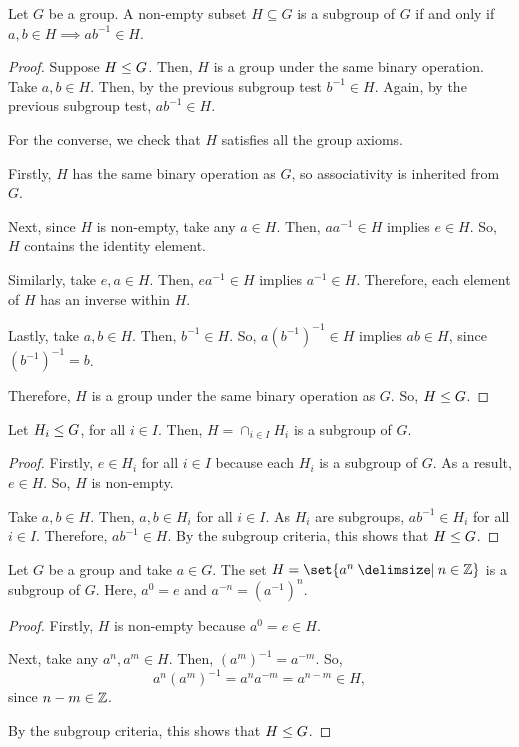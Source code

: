 \documentclass[11pt]{penrose}
\begin{document}
\begin{nthm}
    Let $G$ be a group. A non-empty subset $H \subseteq G$ is a subgroup of $G$ if and only if $a, b \in H \implies ab^{-1} \in H$.
\end{nthm}
\begin{proof}
    Suppose $H \mathrel{\leq} G$. Then, $H$ is a group under the same binary operation. Take $a, b \in H$. Then, by the previous subgroup test $b^{-1} \in H$. Again, by the previous subgroup test, $a b^{-1} \in H$.

    For the converse, we check that $H$ satisfies all the group axioms.

    Firstly, $H$ has the same binary operation as $G$, so associativity is inherited from $G$.

    Next, since $H$ is non-empty, take any $a \in H$. Then, $a a^{-1} \in H$ implies $e \in H$. So, $H$ contains the identity element.

    Similarly, take $e, a \in H$. Then, $e a^{-1} \in H$ implies $a^{-1} \in H$. Therefore, each element of $H$ has an inverse within $H$.

    Lastly, take $a, b \in H$. Then, $b^{-1} \in H$. So, $a \left(b^{-1}\right)^{-1} \in H$ implies $ab \in H$, since $\left(b^{-1}\right)^{-1} = b$.

    Therefore, $H$ is a group under the same binary operation as $G$. So, $H \mathrel{\leq} G$.
\end{proof}

\begin{nthm}
    Let $H_i \mathrel{\leq} G$, for all $i \in I$. Then, $H = \cap_{i \in I} H_i$ is a subgroup of $G$.
\end{nthm}
\begin{proof}
    Firstly, $e \in H_i$ for all $i \in I$ because each $H_i$ is a subgroup of $G$. As a result, $e \in H$. So, $H$ is non-empty.

    Take $a, b \in H$. Then, $a, b \in H_i$ for all $i \in I$. As $H_i$ are subgroups, $ab^{-1} \in H_i$ for all $i \in I$. Therefore, $ab^{-1} \in H$. By the subgroup criteria, this shows that $H \mathrel{\leq} G$.
\end{proof}

\begin{nthm}
    Let $G$ be a group and take $a \in G$. The set $H = \set{a^n \st n \in \Z}$ is a subgroup of $G$. Here, $a^0 = e$ and $a^{-n} = \left(a^{-1}\right)^{n}$.
\end{nthm}
\begin{proof}
    Firstly, $H$ is non-empty because $a^0 = e \in H$.

    Next, take any $a^{n}, a^{m} \in H$. Then, $(a^{m})^{-1} = a^{-m}$. So,
    \begin{equation*}
        a^{n} (a^{m})^{-1}
        = a^{n} a^{-m}
        = a^{n - m} \in H,
    \end{equation*}
    since $n - m \in \mathbb{Z}$.

    By the subgroup criteria, this shows that $H \mathrel{\leq} G$.
\end{proof}
\end{document}
